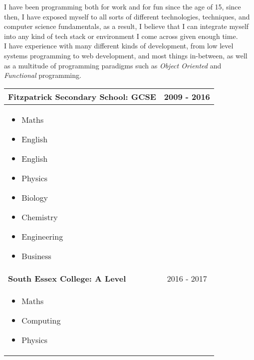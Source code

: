 \documentclass[11pt, twoside, a4paper]{article}
\newlength{\cvSideWidth}
\begin{document}
\begin{minipage}[t]{\textwidth - \cvSideWidth - 3cm}

    { \LARGE {} }

    I have been programming both for work and for fun since the age of 15,
    since then, I have exposed myself to all sorts of different technologies,
    techniques, and computer science fundamentals, as a result, I believe that
    I can integrate myself into any kind of tech stack or environment I come
    across given enough time. \\

    I have experience with many different kinds of development, from low level
    systems programming to web development, and most things in-between, as well
    as a multitude of programming paradigms such as \textit{Object Oriented}
    and \textit{Functional} programming.

    { \vspace{0.5cm} \LARGE {} }

    \begin{center}
        \begin{tabularx}{0.9\textwidth}{ >{\raggedright\arraybackslash}X c}
            \textbf{Fitzpatrick Secondary School: GCSE} & 2009 - 2016 \\
            \hline
            \begin{itemize}
                \item Maths               
                \item English 
                \item English 
                \item Physics             
                \item Biology             
                \item Chemistry           
                \item Engineering         
                \item Business            
            \end{itemize} \\

            \textbf{South Essex College: A Level} & 2016 - 2017 \\
            \hline
            \begin{itemize}
                \item Maths
                \item Computing
                \item Physics
            \end{itemize} \\


\end{tabularx}
\end{center}
\end{minipage}
\end{document}
